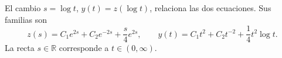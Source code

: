 El cambio \(s=\log t\), \(y(t)=z(\log t)\), relaciona las dos ecuaciones. Sus familias son
\[
z(s)=C_1e^{2s}+C_2e^{-2s}+\frac{s}{4}e^{2s},
\qquad
y(t)=C_1t^2+C_2t^{-2}+\frac14t^2\log t.
\]
La recta \(s\in\mathbb R\) corresponde a \(t\in(0,\infty)\).
